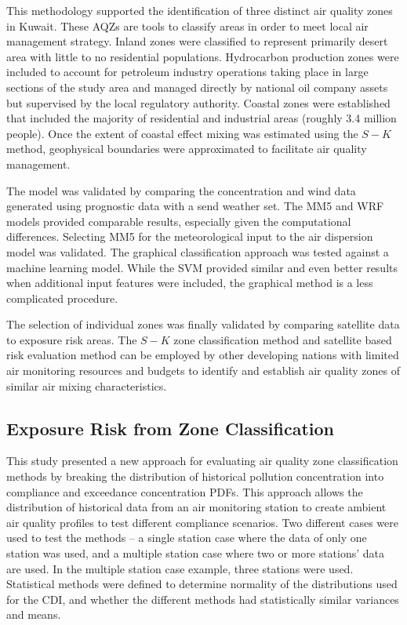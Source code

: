 This methodology supported the identification of three distinct air quality zones in Kuwait.  These AQZs are tools to classify areas in order to meet local air management strategy.  Inland zones were classified to represent primarily desert area with little to no residential populations.  Hydrocarbon production zones were included to account for petroleum industry operations taking place in large sections of the study area and managed directly by national oil company assets but supervised by the local regulatory authority.  Coastal zones were established that included the majority of residential and industrial areas (roughly 3.4 million people).  Once the extent of coastal effect mixing was estimated using the $S-K$ method, geophysical boundaries were approximated to facilitate air quality management. 

The model was validated by comparing the concentration and wind data generated using prognostic data with a send weather set. The MM5 and WRF models provided comparable results, especially given the computational differences. Selecting MM5 for the meteorological input to the air dispersion model was validated. The graphical classification approach was tested against a machine learning model. While the SVM provided similar and even better results when additional input features were included, the graphical method is a less complicated procedure.

The selection of individual zones was finally validated by comparing satellite data to exposure risk areas.  The $S-K$ zone classification method and satellite based risk evaluation method can be employed by other developing nations with limited air monitoring resources and budgets to identify and establish air quality zones of similar air mixing characteristics.

\subsection{Exposure Risk from Zone Classification}

This study presented a new approach for evaluating air quality zone classification methods by breaking the distribution of historical pollution concentration into compliance and exceedance concentration PDFs. This approach allows the distribution of historical data from an air monitoring station to create ambient air quality profiles to test different compliance scenarios. Two different cases were used to test the methods – a single station case where the data of only one station was used, and a multiple station case where two or more stations’ data are used. In the multiple station case example, three stations were used. Statistical methods were defined to determine normality of the distributions used for the CDI, and whether the different methods had statistically similar variances and means.

